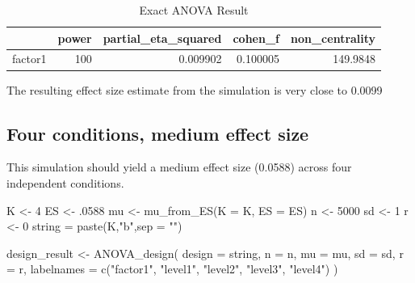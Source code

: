 \documentclass[
]{book}
\newenvironment{Shaded}{\begin{snugshade}}{\end{snugshade}}
\newcommand{\AttributeTok}[1]{\textcolor[rgb]{0.77,0.63,0.00}{#1}}
\newcommand{\DecValTok}[1]{\textcolor[rgb]{0.00,0.00,0.81}{#1}}
\newcommand{\FunctionTok}[1]{\textcolor[rgb]{0.00,0.00,0.00}{#1}}
\newcommand{\NormalTok}[1]{#1}
\newcommand{\OtherTok}[1]{\textcolor[rgb]{0.56,0.35,0.01}{#1}}
\newcommand{\StringTok}[1]{\textcolor[rgb]{0.31,0.60,0.02}{#1}}
\begin{document}
\begin{table}[!h]

\caption{\label{tab:unnamed-chunk-74}Exact ANOVA Result}
\centering
\begin{tabular}[t]{l|r|r|r|r}
\hline
  & power & partial\_eta\_squared & cohen\_f & non\_centrality\\
\hline
factor1 & 100 & 0.009902 & 0.100005 & 149.9848\\
\hline
\end{tabular}
\end{table}

The resulting effect size estimate from the simulation is very close to 0.0099

\hypertarget{four-conditions-medium-effect-size}{%
\subsection{Four conditions, medium effect size}\label{four-conditions-medium-effect-size}}

This simulation should yield a medium effect size (0.0588) across four independent conditions.

\begin{Shaded}
\begin{Highlighting}[]
\NormalTok{K }\OtherTok{\textless{}{-}} \DecValTok{4}
\NormalTok{ES }\OtherTok{\textless{}{-}}\NormalTok{ .}\DecValTok{0588}
\NormalTok{mu }\OtherTok{\textless{}{-}} \FunctionTok{mu\_from\_ES}\NormalTok{(}\AttributeTok{K =}\NormalTok{ K, }\AttributeTok{ES =}\NormalTok{ ES)}
\NormalTok{n }\OtherTok{\textless{}{-}} \DecValTok{5000}
\NormalTok{sd }\OtherTok{\textless{}{-}} \DecValTok{1}
\NormalTok{r }\OtherTok{\textless{}{-}} \DecValTok{0}
\NormalTok{string }\OtherTok{=} \FunctionTok{paste}\NormalTok{(K,}\StringTok{"b"}\NormalTok{,}\AttributeTok{sep =} \StringTok{""}\NormalTok{)}
\end{Highlighting}
\end{Shaded}

\begin{Shaded}
\begin{Highlighting}[]
\NormalTok{design\_result }\OtherTok{\textless{}{-}} \FunctionTok{ANOVA\_design}\NormalTok{(}
  \AttributeTok{design =}\NormalTok{ string,}
  \AttributeTok{n =}\NormalTok{ n,}
  \AttributeTok{mu =}\NormalTok{ mu,}
  \AttributeTok{sd =}\NormalTok{ sd,}
  \AttributeTok{r =}\NormalTok{ r,}
  \AttributeTok{labelnames =} \FunctionTok{c}\NormalTok{(}\StringTok{"factor1"}\NormalTok{, }\StringTok{"level1"}\NormalTok{, }\StringTok{"level2"}\NormalTok{, }\StringTok{"level3"}\NormalTok{, }\StringTok{"level4"}\NormalTok{)}
\NormalTok{  )}
\end{Highlighting}
\end{Shaded}
\end{document}
